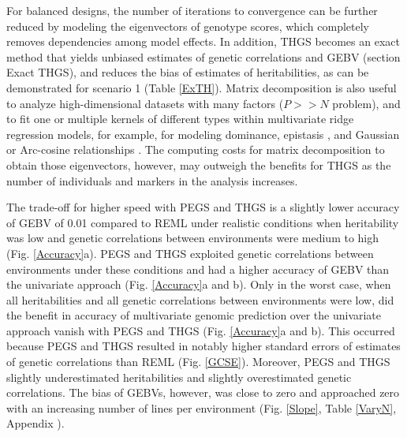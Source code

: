 \documentclass{bmcart}
\begin{document}
For balanced designs, the number of iterations to convergence can be further reduced by modeling the eigenvectors of genotype scores, which completely removes dependencies among model effects. In addition, THGS becomes an exact method that yields unbiased estimates of genetic correlations and GEBV (section Exact THGS), and reduces the bias of estimates of heritabilities, as can be demonstrated for scenario 1 (Table \ref{ExTH}). Matrix decomposition is also useful to analyze high-dimensional datasets with many factors ($P>>N$ problem), and to fit one or multiple kernels of different types within multivariate ridge regression models, for example, for modeling dominance, epistasis \cite{Xu2013}, and Gaussian or Arc-cosine relationships \cite{Xavier2021,Kernel2021}. The computing costs for matrix decomposition to obtain those eigenvectors, however, may outweigh the benefits for THGS as the  number of individuals and markers in the analysis increases.

The trade-off for higher speed with PEGS and THGS is a slightly lower accuracy of GEBV of 0.01 compared to REML under realistic conditions when heritability was low and genetic correlations between environments were medium to high (Fig. \ref{Accuracy}a). PEGS and THGS exploited genetic correlations between environments under these conditions and had a higher accuracy of GEBV than the univariate approach (Fig. \ref{Accuracy}a and b). Only in the worst case, when all heritabilities and all genetic correlations between environments were low, did the benefit in accuracy of multivariate genomic prediction over the univariate approach vanish with PEGS and THGS (Fig. \ref{Accuracy}a and b). This occurred because PEGS and THGS resulted in notably higher standard errors of estimates of genetic correlations than REML (Fig. \ref{GCSE}). Moreover, PEGS and THGS slightly underestimated heritabilities and slightly overestimated genetic correlations. The bias of GEBVs, however, was close to zero and approached zero with an increasing number of lines per environment (Fig. \ref{Slope}, Table \ref{VaryN}, Appendix \label{AppTab}).
\end{document}
